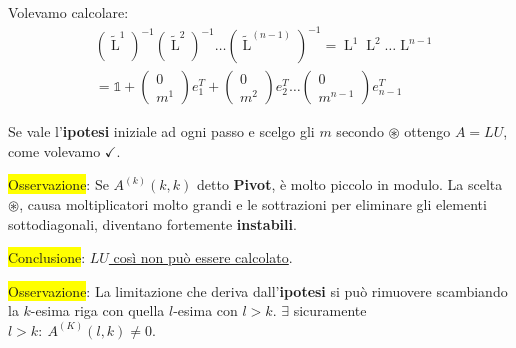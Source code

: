 \documentclass{article}
\begin{document}
Volevamo calcolare:
\begin{align*}
     & \left(\widetilde{\operatorname{L}}^1\right)^{-1}\left(\widetilde{\operatorname{L}}^2\right)^{-1}\dots\left(\widetilde{\operatorname{L}}^{(n-1)}\right)^{-1}=\operatorname{L}^1\operatorname{L}^2\dots\operatorname{L}^{n-1} \\
     & =\mathbb 1+\begin{pmatrix}
                      0 \\
                      m^{1}
                  \end{pmatrix}e^T_{1}+\begin{pmatrix}
                                           0 \\
                                           m^{2}
                                       \end{pmatrix}e^T_{2}\dots\begin{pmatrix}
                                                                    0 \\
                                                                    m^{n-1}
                                                                \end{pmatrix}e^T_{n-1}
\end{align*}

Se vale l'\textbf{ipotesi} iniziale ad ogni passo e scelgo gli $m$ secondo $\circledast$ ottengo $A=LU$, come volevamo $\checkmark$.

\colorbox{yellow}{Osservazione}: Se $A^{(k)}(k,k)$ detto \textbf{Pivot}, è molto piccolo in modulo. La scelta $\circledast$, causa
moltiplicatori molto grandi e le sottrazioni per eliminare gli elementi sottodiagonali, diventano fortemente \textbf{instabili}.

\colorbox{yellow}{Conclusione}: \underline{$LU$ così non può essere calcolato}.

\colorbox{yellow}{Osservazione}: La limitazione che deriva dall'\textbf{ipotesi} si può rimuovere scambiando
la $k$-esima riga con quella $l$-esima con $l>k$.
$\exists$ sicuramente $l>k:\ A^{(K)}(l,k)\ne0$.
\end{document}
